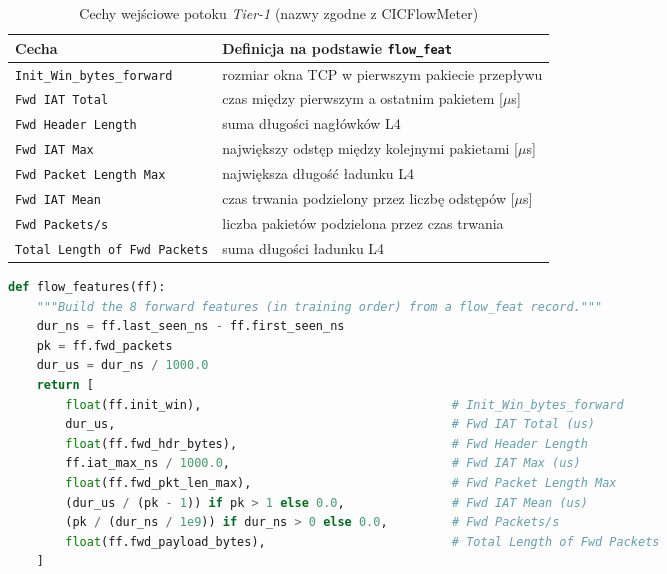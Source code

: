 \documentclass[a4paper,12pt]{article}
\begin{document}
\begin{table}[H]
\centering
\small
\caption{Cechy wejściowe potoku \textit{Tier-1} (nazwy zgodne z CICFlowMeter)}\label{tab:cechy_tier1}
\begin{tabularx}{\linewidth}{@{}L{5.2cm}Y@{}}
\toprule
Cecha & Definicja na podstawie \texttt{flow\_feat} \\
\midrule
\texttt{Init\_Win\_bytes\_forward} & rozmiar okna TCP w pierwszym pakiecie przepływu \\
\texttt{Fwd IAT Total} & czas między pierwszym a ostatnim pakietem [$\mu$s] \\
\texttt{Fwd Header Length} & suma długości nagłówków L4 \\
\texttt{Fwd IAT Max} & największy odstęp między kolejnymi pakietami [$\mu$s] \\
\texttt{Fwd Packet Length Max} & największa długość ładunku L4 \\
\texttt{Fwd IAT Mean} & czas trwania podzielony przez liczbę odstępów [$\mu$s] \\
\texttt{Fwd Packets/s} & liczba pakietów podzielona przez czas trwania \\
\texttt{Total Length of Fwd Packets} & suma długości ładunku L4 \\
\bottomrule
\end{tabularx}
\end{table}

\begin{lstlisting}[language=Python, caption={Wyznaczanie cech przepływu dla potoku \textit{Tier-1} (\texttt{control\_plane.py}, wiersze 339--358; skrócono docstring, jednostkę w komentarzach zapisano jako \texttt{us})}, label=lst:flowfeat]
def flow_features(ff):
    """Build the 8 forward features (in training order) from a flow_feat record."""
    dur_ns = ff.last_seen_ns - ff.first_seen_ns
    pk = ff.fwd_packets
    dur_us = dur_ns / 1000.0
    return [
        float(ff.init_win),                                   # Init_Win_bytes_forward
        dur_us,                                               # Fwd IAT Total (us)
        float(ff.fwd_hdr_bytes),                              # Fwd Header Length
        ff.iat_max_ns / 1000.0,                               # Fwd IAT Max (us)
        float(ff.fwd_pkt_len_max),                            # Fwd Packet Length Max
        (dur_us / (pk - 1)) if pk > 1 else 0.0,               # Fwd IAT Mean (us)
        (pk / (dur_ns / 1e9)) if dur_ns > 0 else 0.0,         # Fwd Packets/s
        float(ff.fwd_payload_bytes),                          # Total Length of Fwd Packets
    ]
\end{lstlisting}
\end{document}
